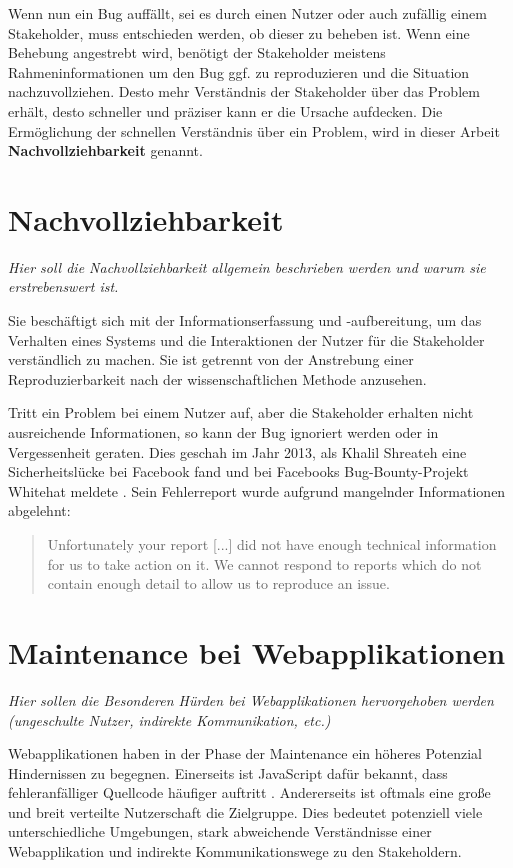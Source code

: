 	Wenn nun ein Bug auffällt, sei es durch einen Nutzer oder auch zufällig einem Stakeholder, muss entschieden werden, ob dieser zu beheben ist. Wenn eine Behebung angestrebt wird, benötigt der Stakeholder meistens Rahmeninformationen \cite{WhatMakesAGoodBugReport} um den Bug ggf. zu reproduzieren und die Situation nachzuvollziehen. Desto mehr Verständnis der Stakeholder über das Problem erhält, desto schneller und präziser kann er die Ursache aufdecken. Die Ermöglichung der schnellen Verständnis über ein Problem, wird in dieser Arbeit \textbf{Nachvollziehbarkeit} genannt.

\section{Nachvollziehbarkeit}

	\textit{Hier soll die Nachvollziehbarkeit allgemein beschrieben werden und warum sie erstrebenswert ist.}

	Sie beschäftigt sich mit der Informationserfassung und -aufbereitung, um das Verhalten eines Systems und die Interaktionen der Nutzer für die Stakeholder verständlich zu machen. Sie ist getrennt von der Anstrebung einer Reproduzierbarkeit nach der wissenschaftlichen Methode anzusehen.
	
	{\color{red}\textit{\lipsum[1]}}
	
	Tritt ein Problem bei einem Nutzer auf, aber die Stakeholder erhalten nicht ausreichende Informationen, so kann der Bug ignoriert werden oder in Vergessenheit geraten. Dies geschah im Jahr 2013, als Khalil Shreateh eine Sicherheitslücke bei Facebook fand und bei Facebooks Bug-Bounty-Projekt Whitehat meldete \cite{FacebookBugBounyHunt}. Sein Fehlerreport wurde aufgrund mangelnder Informationen abgelehnt:
	
	\begin{quotation}
	Unfortunately your report [...] did not have enough technical information for us to take action  on  it. We  cannot  respond  to  reports  which  do  not contain enough detail to allow us to reproduce an issue.
	\end{quotation}

\section{Maintenance bei Webapplikationen}

	\textit{Hier sollen die Besonderen Hürden bei Webapplikationen hervorgehoben werden (ungeschulte Nutzer, indirekte Kommunikation, etc.)}
	
	Webapplikationen haben in der Phase der Maintenance ein höheres Potenzial Hindernissen zu begegnen. Einerseits  ist JavaScript dafür bekannt, dass fehleranfälliger Quellcode häufiger auftritt \cite{BuildingStableWebApplications} \cite{BugsJSABenchmarkOfJavaScriptBugs}. Andererseits ist oftmals eine große und breit verteilte Nutzerschaft die Zielgruppe. Dies bedeutet potenziell viele unterschiedliche Umgebungen, stark abweichende Verständnisse einer Webapplikation und indirekte Kommunikationswege zu den Stakeholdern.